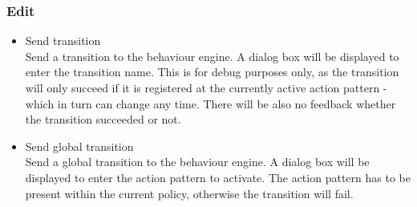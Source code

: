 \subsubsection{Edit}
\begin{itemize}
\item Send transition \\
  Send a transition to the behaviour engine. A dialog box will be
  displayed to enter the transition name. This is for debug purposes
  only, as the transition will only succeed if it is registered at the
  currently active action pattern - which in turn can change any time.
  There will be also no feedback whether the transition succeeded or
  not.
\item Send global transition \\
  Send a global transition to the behaviour engine. A dialog box will be
  displayed to enter the action pattern to activate. The action
  pattern has to be present within the current policy, otherwise the
  transition will fail.
\end{itemize}

